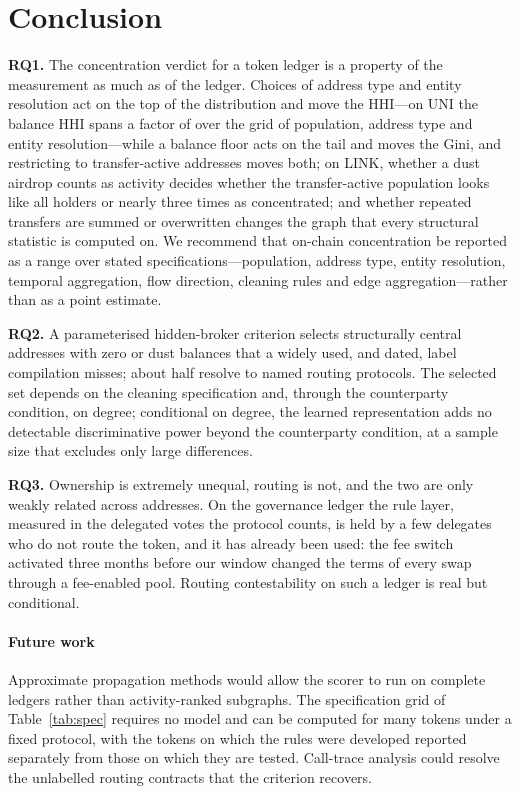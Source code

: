 \section{Conclusion}
\label{sec:conclusion}

\textbf{RQ1.} The concentration verdict for a token ledger is a property of
the measurement as much as of the ledger. Choices of address type and entity
resolution act on the top of the distribution and move the HHI---on UNI the
balance HHI spans a factor of  over the grid of
population, address type and entity resolution---while a balance floor acts
on the tail and moves the Gini, and restricting to transfer-active addresses
moves both;
on LINK, whether a dust airdrop counts
as activity decides whether the transfer-active population looks like all
holders or nearly three times as concentrated; and whether repeated
transfers are summed or overwritten changes the graph that every structural
statistic is computed on. We recommend that on-chain concentration be
reported as a range over stated specifications---population, address type,
entity resolution, temporal aggregation, flow direction, cleaning rules and
edge aggregation---rather than as a point estimate.

\textbf{RQ2.} A parameterised hidden-broker criterion selects structurally
central addresses with zero or dust balances that a widely used, and dated,
label compilation misses; about half resolve to named routing protocols. The selected
set depends on the cleaning specification and, through the counterparty
condition, on degree; conditional on degree, the learned representation adds
no detectable discriminative power beyond the counterparty condition, at a
sample size that excludes only large differences.

\textbf{RQ3.} Ownership is extremely unequal, routing is not, and the two are
only weakly related across addresses. On the governance ledger the rule
layer, measured in the delegated votes the protocol counts, is held by a few
delegates who do not route the token, and it has already been used: the fee
switch activated three months before our window changed the terms of every
swap through a fee-enabled pool. Routing contestability on such a ledger is
real but conditional.

\paragraph{Future work}
Approximate propagation methods \cite{wang2021agp} would allow the scorer to
run on complete ledgers rather than activity-ranked subgraphs. The
specification grid of Table~\ref{tab:spec} requires no model and can be
computed for many tokens under a fixed protocol, with the tokens on which the
rules were developed reported separately from those on which they are
tested. Call-trace analysis could resolve the unlabelled routing contracts
that the criterion recovers.
